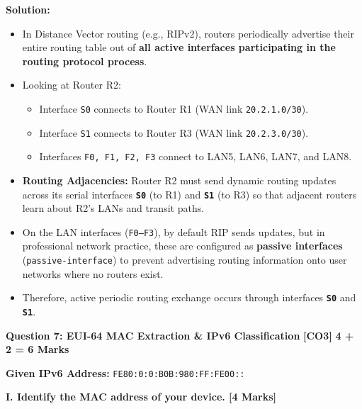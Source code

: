 \documentclass[11pt,a4paper]{article}
\newcommand{\questionheader}[3]{
    \vspace{0.35cm}
    \noindent\colorbox{qboxbg}{
        \parbox{\dimexpr\textwidth-2\fboxsep\relax}{
            \textbf{\textcolor{primary}{\large #1}} \hfill \textbf{\textcolor{accent}{[#2]}} \hfill \textbf{\textcolor{secondary}{#3 Marks}}
        }
    }
    \vspace{0.15cm}
}
\begin{document}
\textbf{Solution:}
\begin{itemize}
    \item In Distance Vector routing (e.g., RIPv2), routers periodically advertise their entire routing table out of \textbf{all active interfaces participating in the routing protocol process}.
    \item Looking at Router R2:
    \begin{itemize}
        \item Interface \texttt{S0} connects to Router R1 (WAN link \texttt{20.2.1.0/30}).
        \item Interface \texttt{S1} connects to Router R3 (WAN link \texttt{20.2.3.0/30}).
        \item Interfaces \texttt{F0, F1, F2, F3} connect to LAN5, LAN6, LAN7, and LAN8.
    \end{itemize}
    \item \textbf{Routing Adjacencies:} Router R2 must send dynamic routing updates across its serial interfaces \textbf{\texttt{S0}} (to R1) and \textbf{\texttt{S1}} (to R3) so that adjacent routers learn about R2's LANs and transit paths.
    \item On the LAN interfaces (\texttt{F0--F3}), by default RIP sends updates, but in professional network practice, these are configured as \textbf{passive interfaces} (\texttt{passive-interface}) to prevent advertising routing information onto user networks where no routers exist.
    \item Therefore, active periodic routing exchange occurs through interfaces \textbf{\texttt{S0}} and \textbf{\texttt{S1}}.
\end{itemize}

\questionheader{Question 7: EUI-64 MAC Extraction \& IPv6 Classification}{CO3}{4 + 2 = 6}

\textbf{Given IPv6 Address:} \texttt{FE80:0:0:B0B:980:FF:FE00::}

\textbf{I. Identify the MAC address of your device. [4 Marks]}
\end{document}
